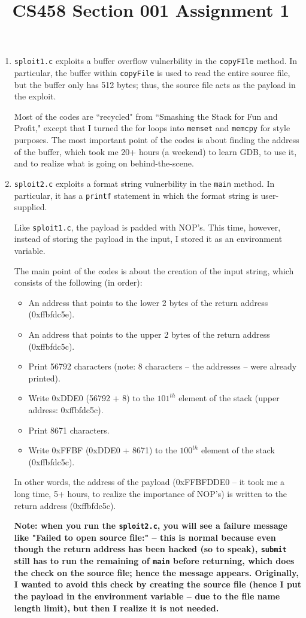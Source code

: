 \documentclass[12pt]{article}
\title{CS458 Section 001 Assignment 1}
\begin{document}
\maketitle

\begin{enumerate}
\item
{\tt sploit1.c} exploits a buffer overflow vulnerbility in the {\tt copyFIle} method.
In particular, the buffer within {\tt copyFile} is used to read the entire source file, but the buffer only has 512 bytes; thus, the source file acts as the payload in the exploit.

Most of the codes are ``recycled" from ``Smashing the Stack for Fun and Profit," except that I turned the for loops into {\tt memset} and {\tt memcpy} for style purposes.
The most important point of the codes is about finding the address of the buffer, which took me 20+ hours (a weekend) to learn GDB, to use it, and to realize what is going on behind-the-scene.
\item
{\tt sploit2.c} exploits a format string vulnerbility in the {\tt main} method.
In particular, it has a {\tt printf} statement in which the format string is user-supplied.

Like {\tt sploit1.c}, the payload is padded with NOP's.
This time, however, instead of storing the payload in the input, I stored it as an environment variable.

The main point of the codes is about the creation of the input string, which consists of the following (in order):
\begin{itemize}
\item
An address that points to the lower 2 bytes of the return address (0xffbfdc5e).
\item
An address that points to the upper 2 bytes of the return address (0xffbfdc5c).
\item
Print 56792 characters (note: 8 characters -- the addresses -- were already printed).
\item
Write 0xDDE0 (56792 + 8) to the $101^{th}$ element of the stack (upper address: 0xffbfdc5c).
\item
Print 8671 characters.
\item
Write 0xFFBF (0xDDE0 + 8671) to the $100^{th}$ element of the stack (0xffbfdc5c).
\end{itemize}
In other words, the address of the payload (0xFFBFDDE0 -- it took me a long time, 5+ hours, to realize the importance of NOP's) is written to the return address (0xffbfdc5c).

{\bf Note: when you run the {\tt sploit2.c}, you will see a failure message like "Failed to open source file:" -- this is normal because even though the return address has been hacked (so to speak), {\tt submit} still has to run the remaining of {\tt main} before returning, which does the check on the source file; hence the message appears.
Originally, I wanted to avoid this check by creating the source file (hence I put the payload in the environment variable -- due to the file name length limit), but then I realize it is not needed.}
\end{enumerate}
\end{document}

